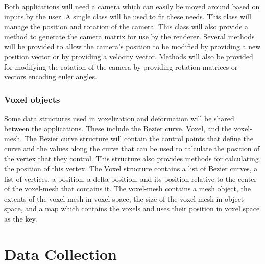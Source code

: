 Both applications will need a camera which can easily be moved around based on inputs by the user.
A single class will be used to fit these needs. This class will manage the position and rotation
of the camera. This class will also provide a method to generate the camera matrix for use by the
renderer. Several methods will be provided to allow the camera's position to be modified by 
providing a new position vector or by providing a velocity vector. Methods will also be provided for
modifying the rotation of the camera by providing rotation matrices or vectors encoding euler angles.

\subsubsection{Voxel objects} \label{VoxelObjects}

Some data structures used in voxelization and deformation will be shared between the applications.
These include the Bezier curve, Voxel, and the voxel-mesh. The Bezier curve structure will contain
the control points that define the curve and the values along the curve that can be used to 
calculate the position of the vertex that they control. This structure also provides methods for
calculating the position of this vertex. The Voxel structure contains a list of Bezier curves, a 
list of vertices, a position, a delta position, and its position relative to the center of the 
voxel-mesh that contains it. The voxel-mesh contains a mesh object, the extents of the voxel-mesh 
in voxel space, the size of the voxel-mesh in object space, and a map which contains the voxels and
uses their position in voxel space as the key.



\section{Data Collection}

